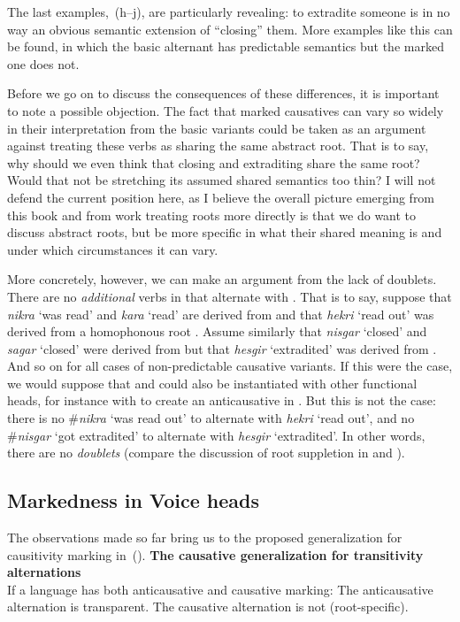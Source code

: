 The last examples,~(\lastx h--j), are particularly revealing: to extradite someone is in no way an obvious semantic extension of ``closing'' them. More examples like this can be found, in which the basic alternant has predictable semantics but the marked one does not.

Before we go on to discuss the consequences of these differences, it is important to note a possible objection. The fact that marked causatives can vary so widely in their interpretation from the basic variants could be taken as an argument against treating these verbs as sharing the same abstract root. That is to say, why should we even think that closing and extraditing share the same root? Would that not be stretching its assumed shared semantics too thin? I will not defend the current position here, as I believe the overall picture emerging from this book and from work treating roots more directly is that we do want to discuss abstract roots, but be more specific in what their shared meaning is and under which circumstances it can vary.

More concretely, however, we can make an argument from the lack of doublets. There are no \emph{additional} verbs in {\tnif} that alternate with {\thif}. That is to say, suppose that \emph{nikra} `was read' and \emph{kara} `read' are derived from  and that \emph{hekri} `read out' was derived from a homophonous root . Assume similarly that \emph{nisgar} `closed' and \emph{sagar} `closed' were derived from  but that \emph{hesgir} `extradited' was derived from . And so on for all cases of non-predictable causative variants. If this were the case, we would suppose that  and  could also be instantiated with other functional heads, for instance with {\vz} to create an anticausative in {\tnif}. But this is not the case: there is no \#\emph{nikra} `was read out' to alternate with \emph{hekri} `read out', and no \#\emph{nisgar} `got extradited' to alternate with \emph{hesgir} `extradited'. In other words, there are no \emph{doublets} (compare the discussion of root suppletion in \citealt{harley14thlia,harley14thlib,harley15roots} and \citealt{borer14thli}).

		\subsection{Markedness in Voice heads} \label{vd:caus:markvoice}
The observations made so far bring us to the proposed generalization for causitivity marking in~(\nextx).
\pex\label{ex:vd:causgen}\textbf{The causative generalization for transitivity alternations}\\
	If a language has both anticausative and causative marking:
	\a The anticausative alternation is transparent.
	\a The causative alternation is not (root-specific).
\xe

